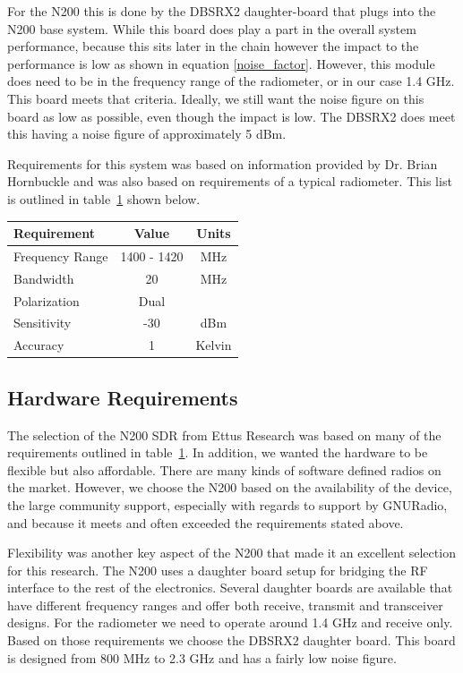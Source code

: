 For the N200 this is done by the DBSRX2 daughter-board that plugs into the N200 base system.  While this board does play a part in the overall system performance, because this sits later in the chain however the impact to the performance is low as shown in equation \ref{noise_factor}.  However, this module does need to be in the frequency range of the radiometer, or in our case 1.4 GHz.  This board meets that criteria.  Ideally, we still want the noise figure on this board as low as possible, even though the impact is low.  The DBSRX2 does meet this having a noise figure of approximately 5 dBm.


Requirements for this system was based on information provided by Dr. Brian Hornbuckle and was also based on requirements of a typical radiometer.  This list is outlined in table~\ref{requirements} shown below.

\begin{table}[h!tb] \centering
{}
\label{requirements}
\begin{tabular}{lcc} \hline
\textbf{Requirement} & \textbf{Value} & \textbf{Units} \\ \hline
Frequency Range & 1400 - 1420 & MHz \\
Bandwidth & 20 & MHz \\
Polarization & Dual &  \\ 
Sensitivity & -30 & dBm \\
Accuracy & 1 & Kelvin \\ \hline
\end{tabular}
\end{table}

\subsection{Hardware Requirements}

The selection of the N200 SDR from Ettus Research was based on many of the requirements outlined in table~\ref{requirements}.  In addition, we wanted the hardware to be flexible but also affordable.  There are many kinds of software defined radios on the market.  However, we choose the N200 based on the availability of the device, the large community support, especially with regards to support by GNURadio, and because it meets and often exceeded the requirements stated above.  

Flexibility was another key aspect of the N200 that made it an excellent selection for this research.  The N200 uses a daughter board setup for bridging the RF interface to the rest of the electronics.  Several daughter boards are available that have different frequency ranges and offer both receive, transmit and transceiver designs.  For the radiometer we need to operate around 1.4 GHz and receive only.  Based on those requirements we choose the DBSRX2 daughter board.  This board is designed from 800 MHz to 2.3 GHz and has a fairly low noise figure.

